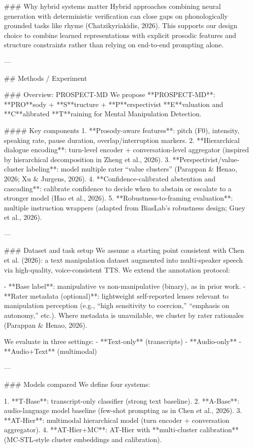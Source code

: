 ### Why hybrid systems matter  
Hybrid approaches combining neural generation with deterministic verification can close gaps on phonologically grounded tasks like rhyme (Chatzikyriakidis, 2026). This supports our design choice to combine learned representations with explicit prosodic features and structure constraints rather than relying on end-to-end prompting alone.

---

## Methods / Experiment  

### Overview: PROSPECT-MD  
We propose **PROSPECT-MD**: **PRO**sody + **S**tructure + **P**erspectivist **E**valuation and **C**alibrated **T**raining for Mental Manipulation Detection.

#### Key components  
1. **Prosody-aware features**: pitch (F0), intensity, speaking rate, pause duration, overlap/interruption markers.  
2. **Hierarchical dialogue encoding**: turn-level encoder + conversation-level aggregator (inspired by hierarchical decomposition in Zheng et al., 2026).  
3. **Perspectivist/value-cluster labeling**: model multiple rater “value clusters” (Parappan & Henao, 2026; Xu & Jurgens, 2026).  
4. **Confidence-calibrated abstention and cascading**: calibrate confidence to decide when to abstain or escalate to a stronger model (Hao et al., 2026).  
5. **Robustness-to-framing evaluation**: multiple instruction wrappers (adapted from BiasLab’s robustness design; Guey et al., 2026).

---

### Dataset and task setup  
We assume a starting point consistent with Chen et al. (2026): a text manipulation dataset augmented into multi-speaker speech via high-quality, voice-consistent TTS. We extend the annotation protocol:

- **Base label**: manipulative vs non-manipulative (binary), as in prior work.  
- **Rater metadata (optional)**: lightweight self-reported lenses relevant to manipulation perception (e.g., “high sensitivity to coercion,” “emphasis on autonomy,” etc.). Where metadata is unavailable, we cluster by rater rationales (Parappan & Henao, 2026).

We evaluate in three settings:  
- **Text-only** (transcripts)  
- **Audio-only**  
- **Audio+Text** (multimodal)

---

### Models compared  
We define four systems:

1. **T-Base**: transcript-only classifier (strong text baseline).  
2. **A-Base**: audio-language model baseline (few-shot prompting as in Chen et al., 2026).  
3. **AT-Hier**: multimodal hierarchical model (turn encoder + conversation aggregator).  
4. **AT-Hier+MC**: AT-Hier with **multi-cluster calibration** (MC-STL-style cluster embeddings and calibration).


